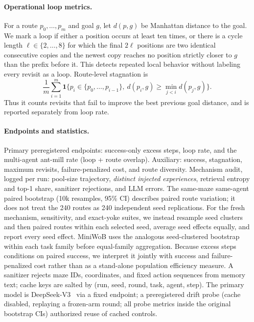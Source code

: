 \documentclass[letterpaper]{article} %
\begin{document}
\paragraph{Operational loop metrics.}
For a route $p_0,\ldots,p_m$ and goal $g$, let $d(p,g)$ be Manhattan distance to the goal.
We mark a loop if either a position occurs at least ten times, or there is a cycle length
$\ell\in\{2,\ldots,8\}$ for which the final $2\ell$ positions are two identical consecutive
copies and the newest copy reaches no position strictly closer to $g$ than the prefix before
it. This detects repeated local behavior without labeling every revisit as a loop. Route-level
stagnation is
\[
  \frac{1}{m}\sum_{i=1}^{m}
  \mathbf{1}\{p_i\in\{p_0,\ldots,p_{i-1}\},\ 
  d(p_i,g)\geq\min_{j<i} d(p_j,g)\}.
\]
Thus it counts revisits that fail to improve the best previous goal distance, and is reported
separately from loop rate.

\paragraph{Endpoints and statistics.}
Primary preregistered endpoints: success-only excess steps, loop rate, and the multi-agent
ant-mill rate (loop + route overlap). Auxiliary: success, stagnation, maximum revisits,
failure-penalized cost, and route diversity. Mechanism audit, logged per run: pool-size
trajectory, \emph{distinct injected experiences}, retrieval entropy and top-1 share,
sanitizer rejections, and LLM errors. The same-maze same-agent paired bootstrap (10k
resamples, 95\% CI) describes paired route variation; it does not treat the 240 routes as 240
independent seed replications. For the fresh mechanism, sensitivity, and exact-yoke suites,
we instead resample seed clusters and then paired routes within each selected seed, average
seed effects equally, and report every seed effect. MiniWoB uses the analogous seed-clustered
bootstrap within each task family before equal-family aggregation.
Because excess steps conditions on paired success, we interpret it jointly with success and
failure-penalized cost rather than as a stand-alone population efficiency measure. A sanitizer
rejects maze IDs, coordinates, and fixed action sequences from memory text; cache keys are
salted by (run, seed, round, task, agent, step). The primary model is
DeepSeek-V3~\citep{deepseek2024v3} via a fixed endpoint; a preregistered drift probe (cache
disabled, replaying a frozen-arm round; all probe metrics inside the original bootstrap CIs)
authorized reuse of cached controls.
\end{document}
